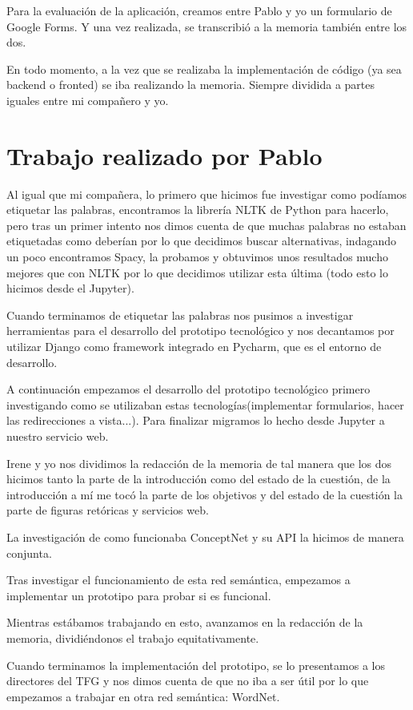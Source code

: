 Para la evaluación de la aplicación, creamos entre Pablo y yo un formulario de Google Forms. Y una vez realizada, se transcribió a la memoria también entre los dos.

En todo momento, a la vez que se realizaba la implementación de código (ya sea backend o fronted) se iba realizando la memoria. Siempre dividida a partes iguales entre mi compañero y yo. 


\section{Trabajo realizado por Pablo}
\label{cap:sec:trabajo_Pablo}

Al igual que mi compañera, lo primero que hicimos fue investigar como podíamos etiquetar las palabras, encontramos la librería NLTK de Python para hacerlo, pero tras un primer intento nos dimos cuenta de que muchas palabras no estaban etiquetadas como deberían por lo que decidimos buscar alternativas, indagando un poco encontramos Spacy, la probamos y obtuvimos unos resultados mucho mejores que con NLTK por lo que decidimos utilizar esta última (todo esto lo hicimos desde el Jupyter). 

Cuando terminamos de etiquetar las palabras nos pusimos a investigar herramientas para el desarrollo del prototipo tecnológico y nos decantamos por utilizar Django como framework integrado en Pycharm, que es el entorno de desarrollo.

A continuación empezamos el desarrollo del prototipo tecnológico primero investigando como se utilizaban estas tecnologías(implementar formularios, hacer las redirecciones a vista...). Para finalizar migramos lo hecho desde Jupyter a nuestro servicio web.

Irene y yo nos dividimos la redacción de la memoria de tal manera que los dos hicimos tanto la parte de la introducción como del estado de la cuestión, de la introducción a mí me tocó la parte de los objetivos y del estado de la cuestión la parte de figuras retóricas y servicios web.

La investigación de como funcionaba ConceptNet y su API la hicimos de manera conjunta.

Tras investigar el funcionamiento de esta red semántica, empezamos a implementar un prototipo para probar si es funcional.

Mientras estábamos trabajando en esto, avanzamos en la redacción de la memoria, dividiéndonos el trabajo equitativamente.

Cuando terminamos la implementación del prototipo, se lo presentamos a los directores del TFG y nos dimos cuenta de que no iba a ser útil por lo que empezamos a trabajar en otra red semántica: WordNet.

